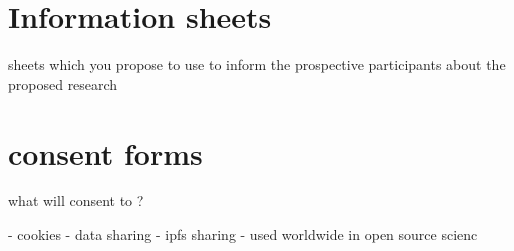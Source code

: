 
\section{Information sheets}
sheets  which you propose to use to inform the prospective participants about the proposed research


\section{consent forms}

what will consent to ?

- cookies
- data sharing
- ipfs sharing
- used worldwide in open source scienc
